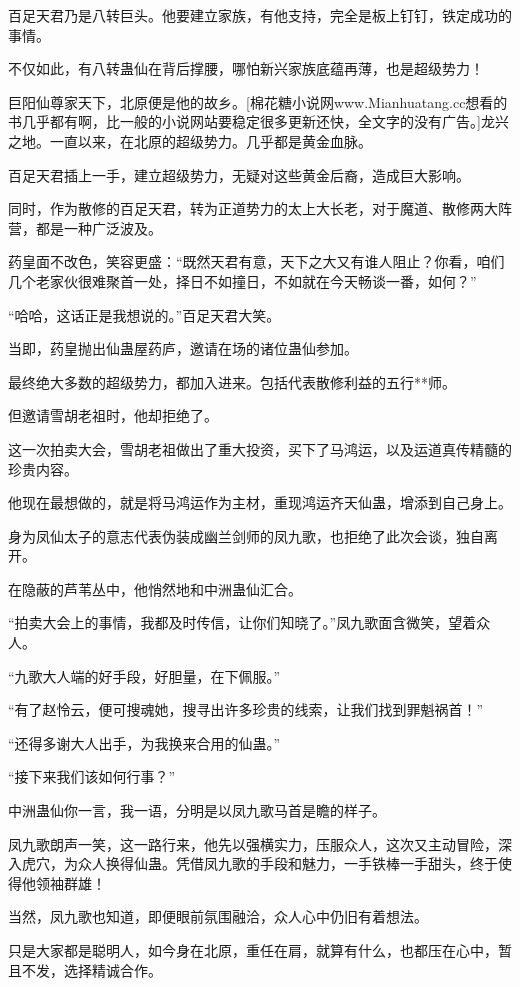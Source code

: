 \begin{this_body}
百足天君乃是八转巨头。他要建立家族，有他支持，完全是板上钉钉，铁定成功的事情。

不仅如此，有八转蛊仙在背后撑腰，哪怕新兴家族底蕴再薄，也是超级势力！

巨阳仙尊家天下，北原便是他的故乡。[棉花糖小说网www.Mianhuatang.cc想看的书几乎都有啊，比一般的小说网站要稳定很多更新还快，全文字的没有广告。]龙兴之地。一直以来，在北原的超级势力。几乎都是黄金血脉。

百足天君插上一手，建立超级势力，无疑对这些黄金后裔，造成巨大影响。

同时，作为散修的百足天君，转为正道势力的太上大长老，对于魔道、散修两大阵营，都是一种广泛波及。

药皇面不改色，笑容更盛：“既然天君有意，天下之大又有谁人阻止？你看，咱们几个老家伙很难聚首一处，择日不如撞日，不如就在今天畅谈一番，如何？”

“哈哈，这话正是我想说的。”百足天君大笑。

当即，药皇抛出仙蛊屋药庐，邀请在场的诸位蛊仙参加。

最终绝大多数的超级势力，都加入进来。包括代表散修利益的五行**师。

但邀请雪胡老祖时，他却拒绝了。

这一次拍卖大会，雪胡老祖做出了重大投资，买下了马鸿运，以及运道真传精髓的珍贵内容。

他现在最想做的，就是将马鸿运作为主材，重现鸿运齐天仙蛊，增添到自己身上。

身为凤仙太子的意志代表伪装成幽兰剑师的凤九歌，也拒绝了此次会谈，独自离开。

在隐蔽的芦苇丛中，他悄然地和中洲蛊仙汇合。

“拍卖大会上的事情，我都及时传信，让你们知晓了。”凤九歌面含微笑，望着众人。

“九歌大人端的好手段，好胆量，在下佩服。”

“有了赵怜云，便可搜魂她，搜寻出许多珍贵的线索，让我们找到罪魁祸首！”

“还得多谢大人出手，为我换来合用的仙蛊。”

“接下来我们该如何行事？”

中洲蛊仙你一言，我一语，分明是以凤九歌马首是瞻的样子。

凤九歌朗声一笑，这一路行来，他先以强横实力，压服众人，这次又主动冒险，深入虎穴，为众人换得仙蛊。凭借凤九歌的手段和魅力，一手铁棒一手甜头，终于使得他领袖群雄！

当然，凤九歌也知道，即便眼前氛围融洽，众人心中仍旧有着想法。

只是大家都是聪明人，如今身在北原，重任在肩，就算有什么，也都压在心中，暂且不发，选择精诚合作。


\end{this_body}
